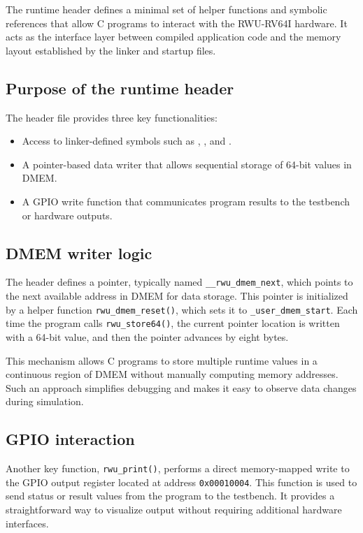 The runtime header defines a minimal set of helper functions and symbolic references that allow C programs to interact with the RWU-RV64I hardware.  
It acts as the interface layer between compiled application code and the memory layout established by the linker and startup files.

\subsection*{Purpose of the runtime header}

The header file provides three key functionalities:
\begin{itemize}
  \item Access to linker-defined symbols such as , , and .
  \item A pointer-based data writer that allows sequential storage of 64-bit values in DMEM.
  \item A GPIO write function that communicates program results to the testbench or hardware outputs.
\end{itemize}


\subsection*{DMEM writer logic}

The header defines a pointer, typically named \texttt{\_\_rwu\_dmem\_next}, which points to the next available address in DMEM for data storage.  
This pointer is initialized by a helper function \texttt{rwu\_dmem\_reset()}, which sets it to \texttt{\_user\_dmem\_start}.  
Each time the program calls \texttt{rwu\_store64()}, the current pointer location is written with a 64-bit value, and then the pointer advances by eight bytes.  

This mechanism allows C programs to store multiple runtime values in a continuous region of DMEM without manually computing memory addresses.  
Such an approach simplifies debugging and makes it easy to observe data changes during simulation.

\subsection*{GPIO interaction}

Another key function, \texttt{rwu\_print()}, performs a direct memory-mapped write to the GPIO output register located at address \texttt{0x00010004}.  
This function is used to send status or result values from the program to the testbench.  
It provides a straightforward way to visualize output without requiring additional hardware interfaces.


